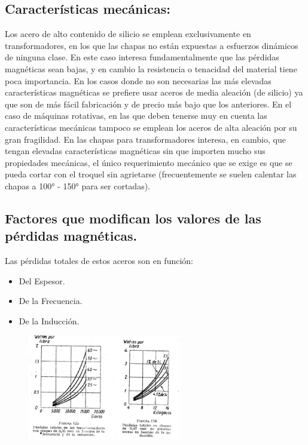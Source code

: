 \documentclass[12pt,a4paper]{article}
\begin{document}
\subsection{Características mecánicas:}
Los acero de alto contenido de silicio se emplean exclusivamente en transformadores, en los que las chapas no están expuestas a esfuerzos dinámicos de ninguna clase. En este caso interesa fundamentalmente que las pérdidas magnéticas sean bajas, y en cambio la resistencia o tenacidad del material tiene poca importancia. En los casos donde no son necesarias las más elevadas características magnéticas se prefiere usar aceros de media aleación (de silicio) ya que son de más fácil fabricación y de precio más bajo que los anteriores. En el caso de máquinas rotativas, en las que deben tenerse muy en cuenta las características mecánicas tampoco se emplean los aceros de alta aleación por su gran fragilidad. En las chapas para transformadores interesa, en cambio, que tengan elevadas características magnéticas sin que importen mucho sus propiedades mecánicas, el único requerimiento mecánico que se exige es que se pueda cortar con el troquel sin agrietarse (frecuentemente se suelen calentar las chapas a 100° - 150° para ser cortadas).

\subsection{Factores que modifican los valores de las pérdidas magnéticas.}

Las pérdidas totales de estos aceros son en función:
\begin{itemize}
    \item Del Espesor.
    \item De la Frecuencia.
    \item De la Inducción.
\end{itemize}

\begin{figure}[H]    
    \centering         
    \includegraphics[width=0.6\textwidth]{IMAGENES LATEX/5.jpg}
\end{figure}
\end{document}
